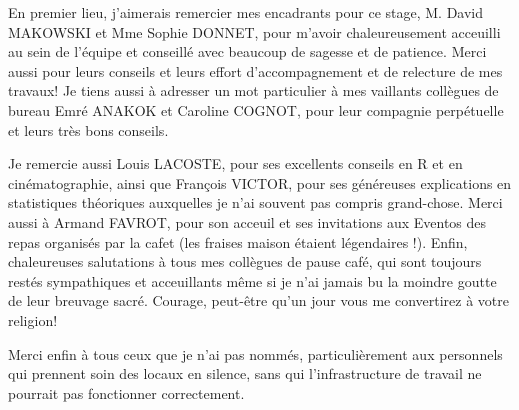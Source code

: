 \documentclass{book}
\begin{document}
\noindent
\large{En premier lieu, j'aimerais remercier mes encadrants pour ce stage, M. David MAKOWSKI et Mme Sophie DONNET, pour m'avoir chaleureusement acceuilli au sein de l'équipe et conseillé avec beaucoup de sagesse et de patience. Merci aussi pour leurs conseils et leurs effort d'accompagnement et de relecture de mes travaux! Je tiens aussi à adresser un mot particulier à mes vaillants collègues de bureau Emré ANAKOK et Caroline COGNOT, pour leur compagnie perpétuelle et leurs très bons conseils.}
\par %
Je remercie aussi Louis LACOSTE, pour ses excellents conseils en R et en cinématographie, ainsi que François VICTOR, pour ses généreuses explications en statistiques théoriques auxquelles je n'ai souvent pas compris grand-chose. Merci aussi à Armand FAVROT, pour son acceuil et ses invitations aux Eventos des repas organisés par la cafet (les fraises maison étaient légendaires !). Enfin, chaleureuses salutations à tous mes collègues de pause café, qui sont toujours restés sympathiques et acceuillants même si je n'ai jamais bu la moindre goutte de leur breuvage sacré. Courage, peut-être qu'un jour vous me convertirez à votre religion!

Merci enfin à tous ceux que je n'ai pas nommés, particulièrement aux personnels qui prennent soin des locaux en silence, sans qui l'infrastructure de travail ne pourrait pas fonctionner correctement.

\thispagestyle{fancy}
\clearpage %


\newpage
\mbox{} %
\thispagestyle{fancy}


\newpage
\fancyhead[LE,RO]{\leftmark}
\tableofcontents %
\thispagestyle{fancy}

\end{document}
